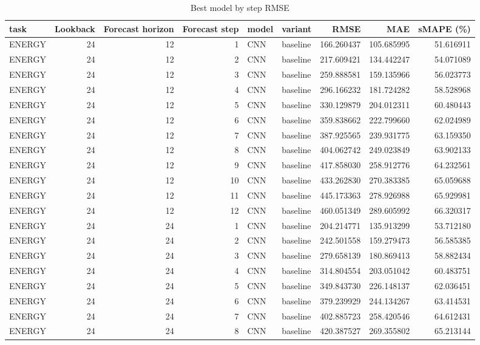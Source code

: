 \begin{table}
\caption{Best model by step RMSE}
\begin{tabular}{lrrrllrrr}
\toprule
task & Lookback & Forecast horizon & Forecast step & model & variant & RMSE & MAE & sMAPE (\%) \\
\midrule
ENERGY & 24 & 12 & 1 & CNN & baseline & 166.260437 & 105.685995 & 51.616911 \\
ENERGY & 24 & 12 & 2 & CNN & baseline & 217.609421 & 134.442247 & 54.071089 \\
ENERGY & 24 & 12 & 3 & CNN & baseline & 259.888581 & 159.135966 & 56.023773 \\
ENERGY & 24 & 12 & 4 & CNN & baseline & 296.166232 & 181.724282 & 58.528968 \\
ENERGY & 24 & 12 & 5 & CNN & baseline & 330.129879 & 204.012311 & 60.480443 \\
ENERGY & 24 & 12 & 6 & CNN & baseline & 359.838662 & 222.799660 & 62.024989 \\
ENERGY & 24 & 12 & 7 & CNN & baseline & 387.925565 & 239.931775 & 63.159350 \\
ENERGY & 24 & 12 & 8 & CNN & baseline & 404.062742 & 249.023849 & 63.902133 \\
ENERGY & 24 & 12 & 9 & CNN & baseline & 417.858030 & 258.912776 & 64.232561 \\
ENERGY & 24 & 12 & 10 & CNN & baseline & 433.262830 & 270.383385 & 65.059688 \\
ENERGY & 24 & 12 & 11 & CNN & baseline & 445.173363 & 278.926988 & 65.929981 \\
ENERGY & 24 & 12 & 12 & CNN & baseline & 460.051349 & 289.605992 & 66.320317 \\
ENERGY & 24 & 24 & 1 & CNN & baseline & 204.214771 & 135.913299 & 53.712180 \\
ENERGY & 24 & 24 & 2 & CNN & baseline & 242.501558 & 159.279473 & 56.585385 \\
ENERGY & 24 & 24 & 3 & CNN & baseline & 279.658139 & 180.869413 & 58.882434 \\
ENERGY & 24 & 24 & 4 & CNN & baseline & 314.804554 & 203.051042 & 60.483751 \\
ENERGY & 24 & 24 & 5 & CNN & baseline & 349.843730 & 226.148137 & 62.036451 \\
ENERGY & 24 & 24 & 6 & CNN & baseline & 379.239929 & 244.134267 & 63.414531 \\
ENERGY & 24 & 24 & 7 & CNN & baseline & 402.885723 & 258.420546 & 64.612431 \\
ENERGY & 24 & 24 & 8 & CNN & baseline & 420.387527 & 269.355802 & 65.213144 \\

\end{tabular}
\end{table}
